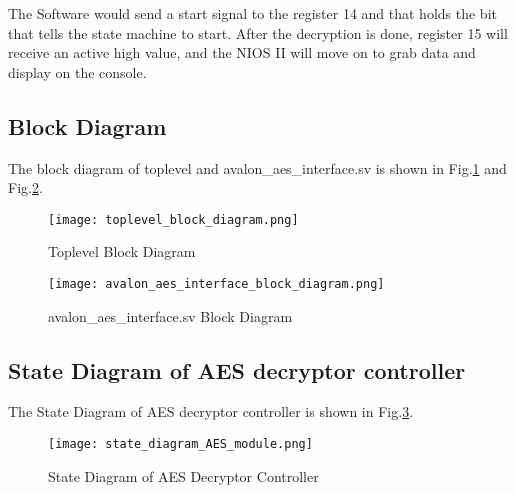 \documentclass[11pt]{article}
\begin{document}
The Software would send a start signal to the register 14 and that holds the bit that tells the state machine to start. After the decryption is done, register 15 will receive an active high value, and the NIOS II will move on to grab data and display on the console. 

\subsection{Block Diagram}
The block diagram of toplevel and avalon\_aes\_interface.sv is shown in Fig.\ref{2_4} and Fig.\ref{2_4+}.
\begin{figure}[htbp]
    \centering
    \texttt{[image: toplevel\_block\_diagram.png]}
    \caption{Toplevel Block Diagram}
    \label{2_4}
\end{figure}
\begin{figure}[htbp]
    \centering
    \texttt{[image: avalon\_aes\_interface\_block\_diagram.png]}
    \caption{avalon\_aes\_interface.sv Block Diagram}
    \label{2_4+}
\end{figure}

\subsection{State Diagram of AES decryptor controller}
The State Diagram of AES decryptor controller is shown in Fig.\ref{2_5}.
\begin{figure}[htbp]
    \centering
    \texttt{[image: state\_diagram\_AES\_module.png]}
    \caption{State Diagram of AES Decryptor Controller}
    \label{2_5}
\end{figure}
\end{document}
